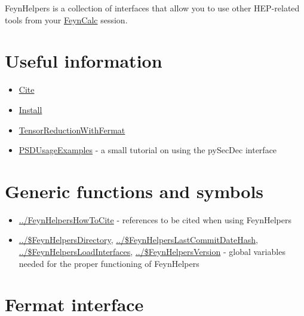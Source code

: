 \documentclass[../FeynHelpersManual.tex]{subfiles}
\begin{document}
FeynHelpers is a collection of interfaces that allow you to use other
HEP-related tools from your \href{https://feyncalc.github.io}{FeynCalc}
session.

\hypertarget{useful information}{
\section{Useful information}\label{useful information}}

\begin{itemize}
\tightlist
\item
  \hyperlink{cite}{Cite}
\item
  \hyperlink{install}{Install}
\item
  \hyperlink{tensorreductionwithfermat}{TensorReductionWithFermat}
\item
  \hyperlink{psdusageexamples}{PSDUsageExamples} - a small tutorial on
  using the pySecDec interface
\end{itemize}

\hypertarget{generic functions and symbols}{
\section{Generic functions and symbols}\label{generic functions and symbols}}

\begin{itemize}
\tightlist
\item
  \hyperlink{../feynhelpershowtocite}{../FeynHelpersHowToCite} -
  references to be cited when using FeynHelpers
\item
  \hyperlink{../dollarfeynhelpersdirectory}{../\$FeynHelpersDirectory},
  \hyperlink{../dollarfeynhelperslastcommitdatehash}{../\$FeynHelpersLastCommitDateHash},
  \hyperlink{../dollarfeynhelpersloadinterfaces}{../\$FeynHelpersLoadInterfaces},
  \hyperlink{../dollarfeynhelpersversion}{../\$FeynHelpersVersion} -
  global variables needed for the proper functioning of FeynHelpers
\end{itemize}

\hypertarget{fermat interface}{
\section{Fermat interface}\label{fermat interface}}
\end{document}
